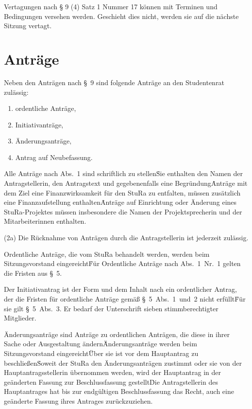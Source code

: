 \begin{multicols}{2}
\Abs \Satz Vertagungen nach § 9 (4) Satz 1 Nummer 17 können mit Terminen und Bedingungen versehen werden. Geschieht dies nicht, werden sie auf die nächste Sitzung vertagt.



\section{Anträge}

\Abs \Satz Neben den Anträgen nach §~9 sind folgende Anträge an den Studentenrat zulässig:
\begin{enumerate}
\item ordentliche Anträge,
\item Initiativanträge,
\item Änderungsanträge,
\item Antrag auf Neubefassung.
\end{enumerate}


\Abs \Satz Alle Anträge nach Abs.~1 sind schriftlich zu stellen\. Sie enthalten den Namen der Antragstellerin, den Antragstext und gegebenenfalls eine Begründung\. Anträge mit dem Ziel eine Finanzwirksamkeit für den StuRa zu entfalten, müssen zusätzlich eine Finanzaufstellung enthalten\. Anträge auf Einrichtung oder Änderung eines StuRa-Projektes müssen insbesondere die Namen der Projektsprecherin und der Mitarbeiterinnen enthalten.

(2a) Die Rücknahme von Anträgen durch die Antragstellerin ist jederzeit zulässig.

\Abs \Satz Ordentliche Anträge, die vom StuRa behandelt werden, werden beim Sitzungsvorstand eingereicht\. Für Ordentliche Anträge nach Abs.~1~Nr.~1 gelten die Fristen aus §~5.

\Abs \Satz Der Initiativantrag ist der Form und dem Inhalt nach ein ordentlicher Antrag, der die Fristen für ordentliche Anträge gemäß §~5~Abs.~1~und~2 nicht erfüllt\. Für sie gilt §~5~Abs.~3. Er bedarf der Unterschrift sieben stimmberechtigter Mitglieder.

\Abs \Satz Änderungsanträge sind Anträge zu ordentlichen Anträgen, die diese in ihrer Sache oder Ausgestaltung ändern\.  Änderungsanträge werden beim Sitzungsvorstand eingereicht\. Über sie ist vor dem Hauptantrag zu beschließen\. Soweit der StuRa den Änderungsanträgen zustimmt oder sie von der Hauptantragsstellerin übernommen werden, wird der Hauptantrag in der geänderten Fassung zur Beschlussfassung gestellt\.  Die Antragstellerin des Hauptantrages hat bis zur endgültigen Beschlussfassung das Recht, auch eine geänderte Fassung ihres Antrages zurückzuziehen.


\end{multicols}
